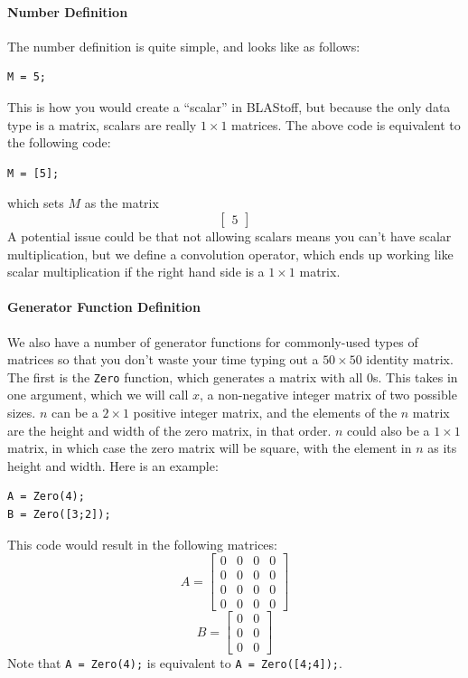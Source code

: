 \paragraph{Number Definition}
The number definition is quite simple, and looks like as follows:

\begin{lstlisting}
M = 5;
\end{lstlisting}
This is how you would create a  ``scalar'' in BLAStoff, but because the only data type is a matrix, scalars are really $1\times 1$ matrices.  The above code is equivalent to the following code:
\begin{lstlisting}
M = [5];
\end{lstlisting}
which sets $M$ as the matrix $$\begin{bmatrix}5\end{bmatrix}$$
A potential issue could be that not allowing scalars means you can't have scalar multiplication, but we define a convolution operator, which ends up working like scalar multiplication if the right hand side is a $1\times 1$ matrix.

\paragraph{Generator Function Definition}
We also have a number of generator functions for commonly-used types of matrices so that you don't waste your time typing out a $50 \times 50$ identity matrix.  The first is the \verb=Zero= function, which generates a matrix with all 0s.  This takes in one argument, which we will call $x$, a non-negative integer matrix of two possible sizes.  $n$ can be a $2 \times 1$  positive  integer matrix, and the elements of the $n$ matrix are the height and width of the zero matrix, in that order.  $n$ could also be a $1\times 1$ matrix, in which case the zero matrix will be square, with the element in $n$ as its height and width.  Here is an example:

\begin{lstlisting}
A = Zero(4);
B = Zero([3;2]);
\end{lstlisting}
This code would result in the following matrices:
$$A=\begin{bmatrix}0&0&0&0\\0&0&0&0\\0&0&0&0\\0&0&0&0\end{bmatrix}$$
$$B=\begin{bmatrix}0&0\\0&0\\0&0\end{bmatrix}$$
Note that \verb|A = Zero(4);| is equivalent to \verb|A = Zero([4;4]);|.

